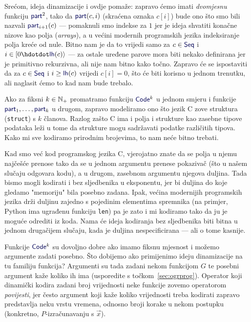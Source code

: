 Srećom, ideja dinamizacije i ovdje pomaže: zapravo ćemo imati \emph{dvomjesnu} funkciju $\f{part}^2$, tako da $\f{part}(c,i)$ (skraćena oznaka $c[i]$) bude ono što smo bili nazvali $\f{part}_{i+1}(c)$ --- pomaknuli smo indekse za $1$ jer je ideja shvatiti konačne nizove kao polja (\emph{arrays}), a u većini modernih programskih jezika indeksiranje polja kreće od nule. Bitno nam je da to vrijedi samo za $c\in\f{Seq}$ i $i\in[0\dd \f{lh}(c)\rangle$ --- za ostale uređene parove mora biti nekako definirana jer je primitivno rekurzivna, ali nije nam bitno kako točno. Zapravo će se ispostaviti da za $c\in\f{Seq}$ i $i\ge\f{lh}(c)$ vrijedi $c[i]=0$, što će biti korisno u jednom trenutku, ali naglasit ćemo to kad nam bude trebalo.

\begin{napomena}[{name=[strukture kao konačni nizovi fiksne duljine]}]
    Ako za fiksni $k\in{\mathbb N}_+$ promatramo funkciju $\f{Code}^k$ u jednom smjeru i funkcije $\f{part}_1,\dotsc,\f{part}_k$ u drugom, zapravo modeliramo ono što jezik C zove struktura (\texttt{struct}) s $k$ članova. Razlog zašto C ima i polja i strukture kao zasebne tipove podataka leži u tome da strukture mogu sadržavati podatke različitih tipova. Kako mi sve kodiramo prirodnim brojevima, to nam neće bitno trebati. %
\end{napomena}

Kad smo već kod programskog jezika C, vjerojatno znate da se polja u njemu najčešće prenose tako da se u jednom argumentu prenese pokazivač (što u našem slučaju odgovara kodu), a u drugom, zasebnom argumentu njegova duljina. Tada bismo mogli kodirati i bez sljedbenika u eksponentu, jer bi duljina do koje gledamo "memoriju" bila posebno zadana. Ipak, većina modernijih programskih jezika drži duljinu zajedno s pojedinim elementima spremnika (na primjer, Python ima ugrađenu funkciju \texttt{len}) pa je zato i mi kodiramo tako da ju je moguće odrediti iz koda. Nama će ideja kodiranja bez sljedbenika biti bitna u jednom drugačijem slučaju, kada je duljina nespecificirana --- ali o tome kasnije.

Funkcije $\f{Code}^k$ su dovoljno dobre ako imamo fiksnu mjesnost i možemo argumente zadati posebno. Što dobijemo ako primijenimo ideju dinamizacije na tu familiju funkcija? Argumenti su tada zadani nekom funkcijom $G$ te posebni argument kaže koliko ih ima (usporedite s točkom~\ref{sec:ogrprog}). Operator koji dinamički kodira zadani broj vrijednosti neke funkcije zovemo operatorom \emph{povijesti}, jer često argument koji kaže koliko vrijednosti treba kodirati zapravo predstavlja neku vrstu vremena, odnosno broji korake u nekom postupku (konkretno, $P$-izračunavanju s $\vec x$).

